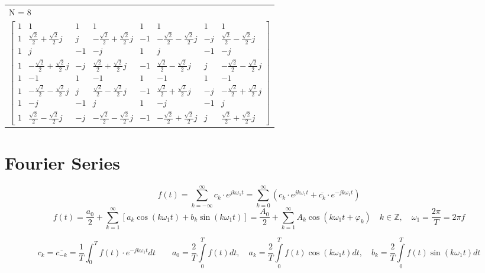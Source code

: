 		\begin{tabular}{l }
        N = 8\\
 		$\begin{bmatrix}
		1 & 1 & 1 & 1 & 1 & 1 & 1 & 1\\ 
		1 & \frac{\sqrt{2}}{2}+\frac{\sqrt{2}}{2}j & j &
		-\frac{\sqrt{2}}{2}+\frac{\sqrt{2}}{2}j & -1 & 
		-\frac{\sqrt{2}}{2}-\frac{\sqrt{2}}{2}j & -j & 
		\frac{\sqrt{2}}{2}-\frac{\sqrt{2}}{2}j\\
		1 & j & -1 & -j & 1 & j & -1 & -j\\
		1 &	-\frac{\sqrt{2}}{2}+\frac{\sqrt{2}}{2}j & -j & 
		\frac{\sqrt{2}}{2}+\frac{\sqrt{2}}{2}j & -1 & 
		\frac{\sqrt{2}}{2}-\frac{\sqrt{2}}{2}j & j &
		-\frac{\sqrt{2}}{2}-\frac{\sqrt{2}}{2}j\\
		1 & -1 & 1 & -1 & 1 & -1 & 1 & -1\\
		1 &	-\frac{\sqrt{2}}{2}-\frac{\sqrt{2}}{2}j & j &
		\frac{\sqrt{2}}{2}-\frac{\sqrt{2}}{2}j & -1 &
		\frac{\sqrt{2}}{2}+\frac{\sqrt{2}}{2}j & -j &
		-\frac{\sqrt{2}}{2}+\frac{\sqrt{2}}{2}j\\
		1 & -j & -1 & j & 1 & -j & -1 & j\\
		1 &	\frac{\sqrt{2}}{2}-\frac{\sqrt{2}}{2}j & -j & 
		-\frac{\sqrt{2}}{2}-\frac{\sqrt{2}}{2}j & -1 &
		-\frac{\sqrt{2}}{2}+\frac{\sqrt{2}}{2}j & j &
		\frac{\sqrt{2}}{2}+\frac{\sqrt{2}}{2}j
		\end{bmatrix}$
		\end{tabular}



	\section{Fourier Series}
  	$$\boxed{f(t) = \sum\limits_{k = -\infty}^{\infty} c_k \cdot e^{j k \omega_1
  	t}}= \boxed{\sum\limits_{k = 0}^{\infty} \left(c_k \cdot e^{j k \omega_1
  	t} + \overline{c_k} \cdot e^{-j k \omega_1t}\right)}$$
  	$$\boxed{f(t) = \frac{a_0}{2} + \sum\limits_{k=1}^{\infty} \left[a_k \cos(k
  	\omega_1 t) + b_k \sin(k \omega_1 t)\right]}=\boxed{\frac{A_0}{2} +
  	\sum\limits_{k=1}^{\infty} A_k \cos(k \omega_1 t + \varphi_k)} \quad k\in
  	\mathbb{Z}, \quad \omega_1=\frac{2 \pi}{T}=2 \pi f$$	
	
	$$\boxed{c_k=\overline{c_{-k}}=\frac{1}{T}\int_0^T{f(t)\cdot
	e^{-jk\omega_1
	t}dt}} \qquad \boxed{a_0 = \frac{2}{T}\int\limits_0^{T} f(t)dt, \quad a_k =
	\frac{2}{T}\int\limits_0^{T} f(t)\cos(k \omega_1 t) dt, \quad b_k =
	\frac{2}{T}\int\limits_0^{T} f(t)\sin(k \omega_1 t) dt}$$

